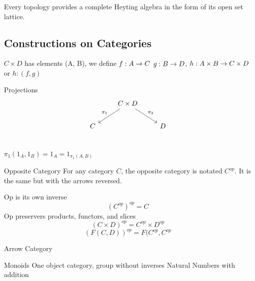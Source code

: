 \documentclass[../notes.tex]{subfiles}
\begin{document}
Every topology provides a complete Heyting algebra in the form of its open set lattice.

\subsection{Constructions on Categories}

$C \times D$  has elements (A, B), we define
$ f : A \rightarrow C $
$ g : B \rightarrow D $,
$ h : A \times B \rightarrow C \times D $ or $ h : (f, g) $




Projections
\[
  \begin{tikzcd}
    & C \times D \arrow[dl, swap, "\pi_1"] \arrow[dr, "\pi_2"] &   \\
    C  &  & D \\
  \end{tikzcd}
\]

$\pi_1( 1_A, 1_B )= 1_A = 1_{\pi_1(A, B)} $

Opposite Category
For any category $C$, the opposite category is notated $C^{op}$.
It is the same but with the arrows reversed.

Op is its own inverse
$$ (C^{op})^{op} = C $$
Op preservers products, functors, and slices %
$$ (C \times D)^{op} = C^{op} \times D^{op} $$
$$ (F(C,D))^{op} = F(C^{op}, C^{op} $$

Arrow Category

\begin{definition}
  Monoids
  One object category, group without inverses
  Natural Numbers with addition
\end{definition}
\end{document}
